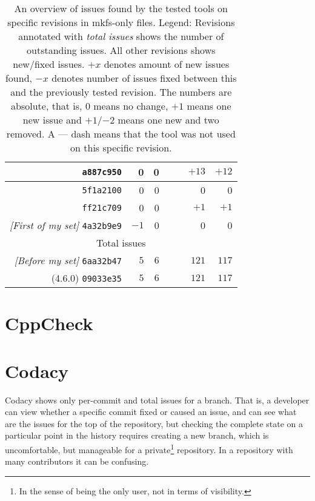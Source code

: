 \begin{table}[h]
\begin{tabular}{|r||r|r|r|r|r|r|}
\hline
{\tt a887c950} & 0 & 0 & & & $+13$ & $+12$ \\
\hline
{\tt 5f1a2100} & 0 & 0 & & & 0 & 0 \\
\hline
{\tt ff21c709} & 0 & 0 & & & $+1$ & $+1$ \\
\hline
{\em [First of my set]} {\tt 4a32b9e9} & $-1$ & 0 & & & 0 & 0 \\
\hline
\hline
\multicolumn{7}{|c|}{Total issues} \\
\hline
{\em [Before my set]} {\tt 6aa32b47} & $5$ & $6$ & & & $121$ & $117$ \\
\hline
(4.6.0) {\tt 09033e35} & $5$ & $6$ & & & $121$ & $117$ \\
\hline
\end{tabular}
\caption{An overview of issues found by the tested tools on specific
	revisions in mkfs-only files.\newline
	\newline
	Legend: Revisions annotated with {\em total issues} shows the
	number of outstanding issues. All other revisions shows new/fixed
	issues.  $+x$ denotes amount of new issues found, $-x$ denotes number
	of issues fixed between this and the previously tested revision. The
	numbers are absolute, that is, 0 means no change, $+1$ means one new
	issue and $+1$/$-2$ means one new and two removed. A --- dash means that
	the tool was not used on this specific revision.}


\label{tab:results:overview}
\end{table}

\section{CppCheck}\label{chap:results:cppcheck}



\section{Codacy}\label{chap:results:codacy}
Codacy shows only per-commit and total issues for a branch. That is, a
developer can view whether a specific commit fixed or caused an issue, and
can see what are the issues for the top of the repository, but checking the
complete state on a particular point in the history requires creating a new
branch, which is uncomfortable, but manageable for a private\footnote{In
the sense of being the only user, not in terms of visibility.} repository.
In a repository with many contributors it can be confusing.

